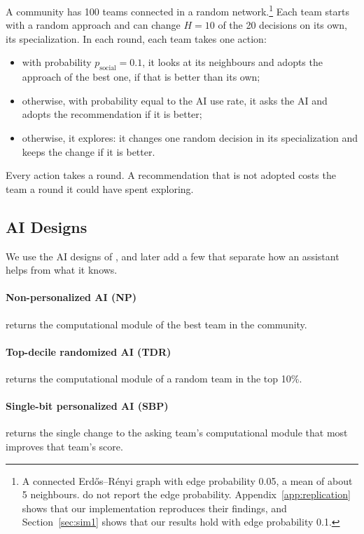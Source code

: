 \documentclass[11pt]{article}
\begin{document}
A community has 100 teams connected in a random network.\footnote{A connected Erd\H{o}s--R\'enyi graph with edge probability 0.05, a mean of about 5 neighbours. \citet{fazelpour2026navigating} do not report the edge probability. Appendix~\ref{app:replication} shows that our implementation reproduces their findings, and Section~\ref{sec:sim1} shows that our results hold with edge probability 0.1.} Each team starts with a random approach and can change $H=10$ of the 20 decisions on its own, its specialization. In each round, each team takes one action:
\begin{itemize}
\item with probability $p_{\text{social}}=0.1$, it looks at its neighbours and adopts the approach of the best one, if that is better than its own;
\item otherwise, with probability equal to the AI use rate, it asks the AI and adopts the recommendation if it is better;
\item otherwise, it explores: it changes one random decision in its specialization and keeps the change if it is better.
\end{itemize}
Every action takes a round. A recommendation that is not adopted costs the team a round it could have spent exploring.

\subsection{AI Designs}

We use the AI designs of \citet{fazelpour2026navigating}, and later add a few that separate how an assistant helps from what it knows.

\paragraph{Non-personalized AI (NP)} returns the computational module of the best team in the community.

\paragraph{Top-decile randomized AI (TDR)} returns the computational module of a random team in the top 10\%.

\paragraph{Single-bit personalized AI (SBP)} returns the single change to the asking team's computational module that most improves that team's score.
\end{document}
